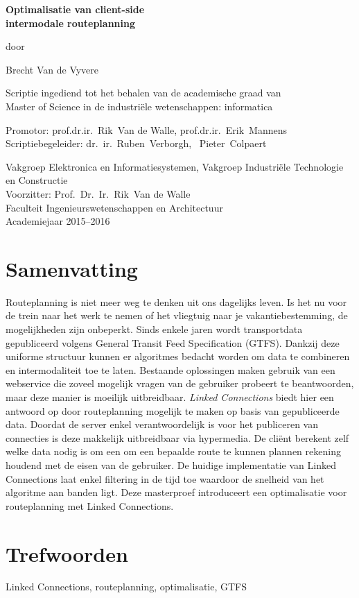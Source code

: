 
\newpage

{
\setlength{\baselineskip}{14pt}
\setlength{\parindent}{0pt}
\setlength{\parskip}{8pt}

\begin{center}

\noindent \textbf{\huge
Optimalisatie van client-side\\[8pt]
intermodale routeplanning
}

door 

Brecht Van de Vyvere

Scriptie ingediend tot het behalen van de academische graad van\\
Master of Science in de industri\"ele wetenschappen: informatica

Promotor: prof.dr.ir.~Rik~Van de Walle, prof.dr.ir.~Erik~Mannens\\
Scriptiebegeleider: dr.~ir.~Ruben~Verborgh, ~Pieter~Colpaert

Vakgroep Elektronica en Informatiesystemen, Vakgroep Industri\"ele Technologie en Constructie\\
Voorzitter: Prof.~Dr.~Ir.~Rik~Van de Walle\\
Faculteit Ingenieurswetenschappen en Architectuur\\
Academiejaar 2015--2016


\end{center}

\section*{Samenvatting}


Routeplanning is niet meer weg te denken uit ons dagelijks leven. Is het nu voor de trein naar het werk te nemen of het vliegtuig naar je vakantiebestemming, de mogelijkheden zijn onbeperkt. Sinds enkele jaren wordt transportdata gepubliceerd volgens General Transit Feed Specification (GTFS). Dankzij deze uniforme structuur kunnen er algoritmes bedacht worden om data te combineren en intermodaliteit toe te laten. Bestaande oplossingen maken gebruik van een webservice die zoveel mogelijk vragen van de gebruiker probeert te beantwoorden, maar deze manier is moeilijk uitbreidbaar. \textit{Linked Connections} biedt hier een antwoord op door routeplanning mogelijk te maken op basis van gepubliceerde data. Doordat de server enkel verantwoordelijk is voor het publiceren van connecties is deze makkelijk uitbreidbaar via hypermedia. De cli\"ent berekent zelf welke data nodig is om een om een bepaalde route te kunnen plannen rekening houdend met de eisen van de gebruiker. De huidige implementatie van Linked Connections laat enkel filtering in de tijd toe waardoor de snelheid van het algoritme aan banden ligt. Deze masterproef introduceert een optimalisatie voor routeplanning met Linked Connections.

\section*{Trefwoorden}


Linked Connections, routeplanning, optimalisatie, GTFS

}

\newpage %

